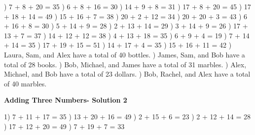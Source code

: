 \documentclass{article}%
\begin{document}
) 7 + 8 + 20 = 35%
) 6 + 8 + 16 = 30%
) 14 + 9 + 8 = 31%
) 17 + 8 + 20 = 45%
) 17 + 18 + 14 = 49%
) 15 + 16 + 7 = 38%
) 20 + 2 + 12 = 34%
) 20 + 20 + 3 = 43%
) 6 + 16 + 8 = 30%
) 5 + 14 + 9 = 28%
) 2 + 13 + 14 = 29%
) 3 + 14 + 9 = 26%
) 17 + 13 + 7 = 37%
) 14 + 12 + 12 = 38%
) 4 + 13 + 18 = 35%
) 6 + 9 + 4 = 19%
) 7 + 14 + 14 = 35%
) 17 + 19 + 15 = 51%
) 14 + 17 + 4 = 35%
) 15 + 16 + 11 = 42%
) Laura, Sam, and Alex have a total of 40 bottles.%
) James, Sam, and Bob have a total of 28 books.%
) Bob, Michael, and James have a total of 31 marbles.%
) Alex, Michael, and Bob have a total of 23 dollars.%
) Bob, Rachel, and Alex have a total of 40 marbles.%
\newline%
\newpage%
\large%
\begin{center}%
\textbf{Adding Three Numbers- Solution 2}%
\newline%
\end{center} \normalsize%
1) 7 + 11 + 17 = 35%
) 13 + 20 + 16 = 49%
) 2 + 15 + 6 = 23%
) 2 + 12 + 14 = 28%
) 17 + 12 + 20 = 49%
) 7 + 19 + 7 = 33%
\end{document}
